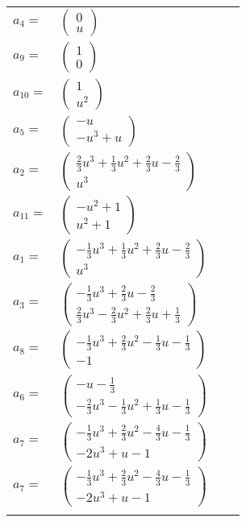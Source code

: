 \documentclass[1p]{elsarticle_modified}
\theoremstyle{definition}
\begin{document}
\begin{tabular}{m{7pt} m{180pt} m{7pt} m{180pt} }
\flushright $a_{4}=$&$\begin{pmatrix}0\\u\end{pmatrix}$ \\
\flushright $a_{9}=$&$\begin{pmatrix}1\\0\end{pmatrix}$ \\
\flushright $a_{10}=$&$\begin{pmatrix}1\\u^2\end{pmatrix}$ \\
\flushright $a_{5}=$&$\begin{pmatrix}- u\\- u^3+u\end{pmatrix}$ \\
\flushright $a_{2}=$&$\begin{pmatrix}\frac{2}{3} u^3+\frac{1}{3} u^2+\frac{2}{3} u-\frac{2}{3}\\u^3\end{pmatrix}$ \\
\flushright $a_{11}=$&$\begin{pmatrix}- u^2+1\\u^2+1\end{pmatrix}$ \\
\flushright $a_{1}=$&$\begin{pmatrix}-\frac{1}{3} u^3+\frac{1}{3} u^2+\frac{2}{3} u-\frac{2}{3}\\u^3\end{pmatrix}$ \\
\flushright $a_{3}=$&$\begin{pmatrix}-\frac{1}{3} u^3+\frac{2}{3} u-\frac{2}{3}\\\frac{2}{3} u^3-\frac{2}{3} u^2+\frac{2}{3} u+\frac{1}{3}\end{pmatrix}$ \\
\flushright $a_{8}=$&$\begin{pmatrix}-\frac{1}{3} u^3+\frac{2}{3} u^2-\frac{1}{3} u-\frac{1}{3}\\-1\end{pmatrix}$ \\
\flushright $a_{6}=$&$\begin{pmatrix}- u-\frac{1}{3}\\-\frac{2}{3} u^3-\frac{1}{3} u^2+\frac{1}{3} u-\frac{1}{3}\end{pmatrix}$ \\
\flushright $a_{7}=$&$\begin{pmatrix}-\frac{1}{3} u^3+\frac{2}{3} u^2-\frac{4}{3} u-\frac{1}{3}\\-2 u^3+u-1\end{pmatrix}$\\ \flushright $a_{7}=$&$\begin{pmatrix}-\frac{1}{3} u^3+\frac{2}{3} u^2-\frac{4}{3} u-\frac{1}{3}\\-2 u^3+u-1\end{pmatrix}$\\&\end{tabular}
\end{document}
